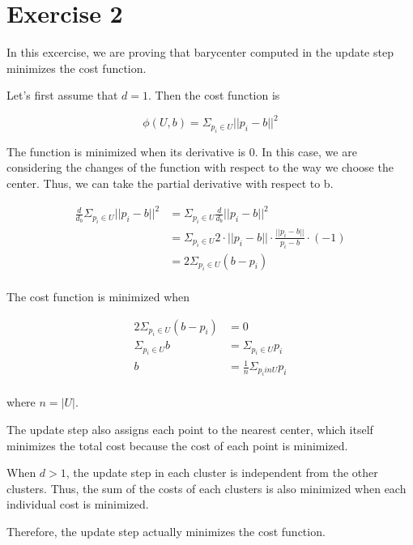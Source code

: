 \section*{Exercise 2}
In this excercise, we are proving that barycenter computed in the update step minimizes the cost function.

Let's first assume that $d = 1$. Then the cost function is 

$$\phi(U,b) = \Sigma_{p_i \in U} ||p_i - b||^2$$

The function is minimized when its derivative is 0. In this case, we are considering the changes of the function with respect to the way
we choose the center. Thus, we can take the partial derivative with respect to b.

\begin{align*}
  \frac{d}{d_b} \Sigma_{p_i \in U} ||p_i - b||^2 &= \Sigma_{p_i \in U} \frac{d}{d_b} ||p_i - b||^2 \\
  &= \Sigma_{p_i \in U} 2 \cdot ||p_i - b|| \cdot \frac{||p_i - b||}{p_i - b} \cdot (-1) \\
  &= 2 \Sigma_{p_i \in U} (b - p_i) \\
\end{align*}

The cost function is minimized when 

\begin{align*}
  2 \Sigma_{p_i \in U} (b - p_i) &= 0 \\
  \Sigma_{p_i \in U} b &= \Sigma_{p_i \in U} p_i \\
  b &= \frac{1}{n} \Sigma_{p_i in U} p_i \\
\end{align*}

where $n = |U|$.

The update step also assigns each point to the nearest center, which itself minimizes the total cost because the cost of each point is minimized.

When $d > 1$, the update step in each cluster is independent from the other clusters. Thus, the sum of the costs of each clusters is also minimized when each individual 
cost is minimized.

Therefore, the update step actually minimizes the cost function.
